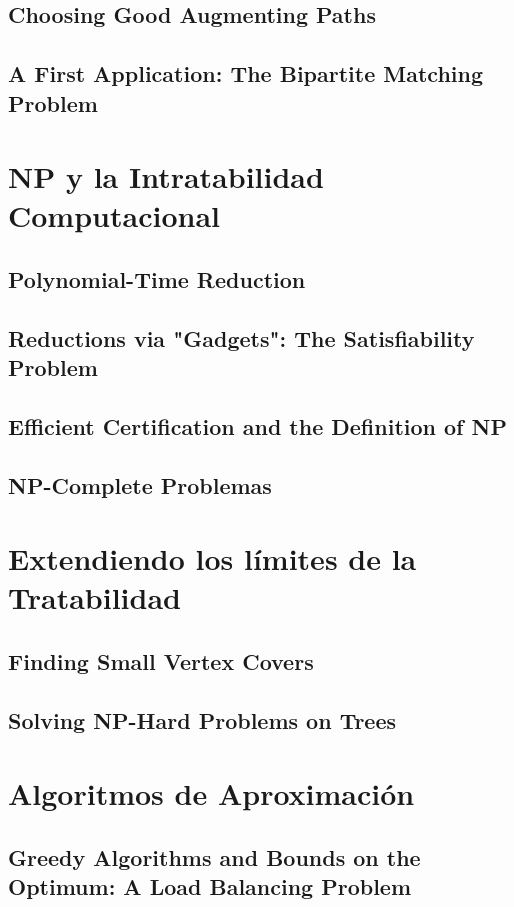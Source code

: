 \documentclass[a4paper, 12pt]{book}
\begin{document}
\section{Choosing Good Augmenting Paths}

\section{A First Application: The Bipartite Matching Problem}



\chapter{NP y la Intratabilidad Computacional}

\section{Polynomial-Time Reduction}

\section{Reductions via "Gadgets": The Satisfiability Problem}

\section{Efficient Certification and the Definition of NP}

\section{NP-Complete Problemas}





\chapter{Extendiendo los límites de la Tratabilidad}

\section{Finding Small Vertex Covers}

\section{Solving NP-Hard Problems on Trees}




\chapter{Algoritmos de Aproximación}

\section{Greedy Algorithms and Bounds on the Optimum: A Load Balancing Problem}
\end{document}
